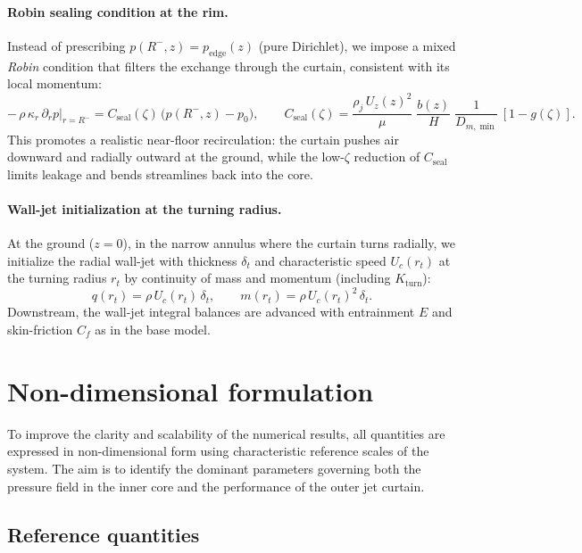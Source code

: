 \documentclass[11pt,a4paper]{article}
\begin{document}
\paragraph*{Robin sealing condition at the rim.}
Instead of prescribing $p(R^{-},z)=p_{\mathrm{edge}}(z)$ (pure Dirichlet), we impose a mixed \emph{Robin} condition that filters the exchange through the curtain, consistent with its local momentum:
\begin{equation}
  -\,\rho\,\kappa_r\,\partial_r p\big|_{r=R^{-}} 
  = C_{\mathrm{seal}}(\zeta)\,\big(p(R^{-},z)-p_0\big),
  \qquad 
  C_{\mathrm{seal}}(\zeta)=\frac{\rho_j\,U_z(z)^2}{\mu}\;\frac{b(z)}{H}\;\frac{1}{D_{m,\min}}\,[1-g(\zeta)].
  \label{eq:robin}
\end{equation}
This promotes a realistic near-floor recirculation: the curtain pushes air downward and radially outward at the ground, while the low-$\zeta$ reduction of $C_{\mathrm{seal}}$ limits leakage and bends streamlines back into the core.

\paragraph*{Wall-jet initialization at the turning radius.}
At the ground ($z=0$), in the narrow annulus where the curtain turns radially, we initialize the radial wall-jet with thickness $\delta_t$ and characteristic speed $U_c(r_t)$ at the turning radius $r_t$ by continuity of mass and momentum (including $K_{\mathrm{turn}}$):
\begin{equation}
  q(r_t)=\rho\,U_c(r_t)\,\delta_t, 
  \qquad 
  m(r_t)=\rho\,U_c(r_t)^2\,\delta_t.
  \label{eq:walljet_init}
\end{equation}
Downstream, the wall-jet integral balances are advanced with entrainment $E$ and skin-friction $C_f$ as in the base model.
\section{Non-dimensional formulation}
\label{sec:non-dimensionalization}

To improve the clarity and scalability of the numerical results, all quantities are expressed in non-dimensional form using characteristic reference scales of the system. The aim is to identify the dominant parameters governing both the pressure field in the inner core and the performance of the outer jet curtain.

\subsection{Reference quantities}
\end{document}

